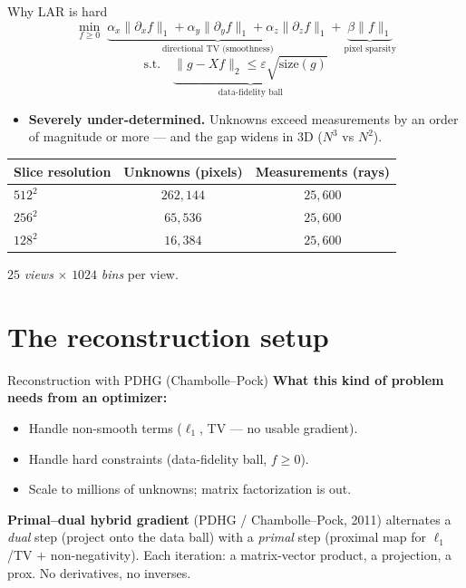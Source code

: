 \documentclass[aspectratio=169,xcolor=dvipsnames]{beamer}
\begin{document}
\begin{frame}{Why LAR is hard}
  \centering
  \small
  \[
    \min_{f \geq 0}\;
      \underbrace{\alpha_x\|\partial_x f\|_1
                + \alpha_y\|\partial_y f\|_1
                + \alpha_z\|\partial_z f\|_1}_{\text{directional TV (smoothness)}}
    + \underbrace{\beta\|f\|_1}_{\text{pixel sparsity}}
  \]
  \vspace{-0.7em}
  \[
    \text{s.t.}\quad
      \underbrace{\|g - Xf\|_2 \leq \varepsilon\sqrt{\mathrm{size}(g)}}_{\text{data-fidelity ball}}
  \]
  \normalsize
  \begin{itemize}\setlength\itemsep{0pt}
    \item \textbf{Severely under-determined.} Unknowns exceed
          measurements by an order of magnitude or more --- and the
          gap widens in 3D ($N^{3}$ vs $N^{2}$).
  \end{itemize}
  \begin{center}
    \scriptsize
    \renewcommand{\arraystretch}{0.8}
    \begin{tabular}{lcc}
      \toprule
      Slice resolution & Unknowns (pixels) & Measurements (rays) \\
      \midrule
      $512^2$ & $262{,}144$ & $25{,}600$ \\
      $256^2$ & $65{,}536$  & $25{,}600$ \\
      $128^2$ & $16{,}384$  & $25{,}600$ \\
      \bottomrule
    \end{tabular}\par\smallskip
    $25$ \emph{views} $\times$ $1024$ \emph{bins} per view.
  \end{center}
\end{frame}

\section[Setup]{The reconstruction setup}

\begin{frame}{Reconstruction with PDHG (Chambolle--Pock)}
  \textbf{What this kind of problem needs from an optimizer:}
  \begin{itemize}\setlength\itemsep{0pt}
    \item Handle non-smooth terms ($\ell_1$, TV --- no usable gradient).
    \item Handle hard constraints (data-fidelity ball, $f \geq 0$).
    \item Scale to millions of unknowns; matrix factorization is out.
  \end{itemize}
  \medskip
  \textbf{Primal--dual hybrid gradient} (PDHG / Chambolle--Pock, 2011)
  alternates a \emph{dual} step (project onto the data ball) with a
  \emph{primal} step (proximal map for $\ell_1$/TV $+$ non-negativity).
  Each iteration: a matrix-vector product, a projection, a prox.
  No derivatives, no inverses.
\end{frame}
\end{document}
